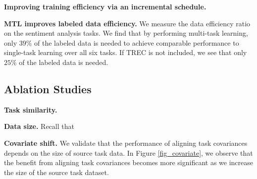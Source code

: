 \textbf{Improving training efficiency via an incremental schedule.}
\todo{}

\textbf{MTL improves labeled data efficiency.}
We measure the data efficiency ratio on the sentiment analysis tasks.
We find that by performing multi-task learning, only $39\%$ of the labeled data is needed to achieve comparable performance to single-task learning over all six tasks.
If TREC is not included, we see that only $25\%$ of the labeled data is needed.


\subsection{Ablation Studies}


\textbf{Task similarity.} \todo{}


\textbf{Data size.}
Recall that


\textbf{Covariate shift.}
We validate that the performance of aligning task covariances depends on the size of source task data.
In Figure \ref{fig_covariate}, we observe that the benefit from aligning task covariances becomes more significant as we increase the size of the source task dataset.


